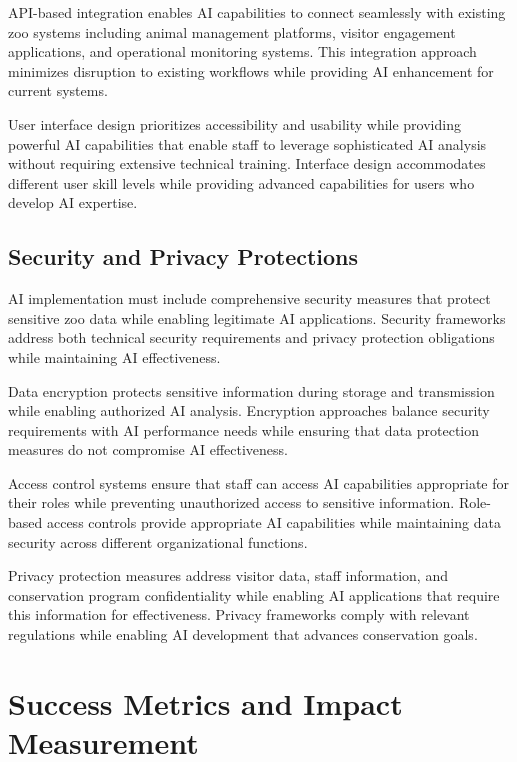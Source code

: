 \documentclass[
  Letterpaper,
]{scrbook}
\begin{document}
API-based integration enables AI capabilities to connect seamlessly with
existing zoo systems including animal management platforms, visitor
engagement applications, and operational monitoring systems. This
integration approach minimizes disruption to existing workflows while
providing AI enhancement for current systems.

User interface design prioritizes accessibility and usability while
providing powerful AI capabilities that enable staff to leverage
sophisticated AI analysis without requiring extensive technical
training. Interface design accommodates different user skill levels
while providing advanced capabilities for users who develop AI
expertise.

\subsection{Security and Privacy
Protections}\label{security-and-privacy-protections}

AI implementation must include comprehensive security measures that
protect sensitive zoo data while enabling legitimate AI applications.
Security frameworks address both technical security requirements and
privacy protection obligations while maintaining AI effectiveness.

Data encryption protects sensitive information during storage and
transmission while enabling authorized AI analysis. Encryption
approaches balance security requirements with AI performance needs while
ensuring that data protection measures do not compromise AI
effectiveness.

Access control systems ensure that staff can access AI capabilities
appropriate for their roles while preventing unauthorized access to
sensitive information. Role-based access controls provide appropriate AI
capabilities while maintaining data security across different
organizational functions.

Privacy protection measures address visitor data, staff information, and
conservation program confidentiality while enabling AI applications that
require this information for effectiveness. Privacy frameworks comply
with relevant regulations while enabling AI development that advances
conservation goals.

\section{Success Metrics and Impact
Measurement}\label{success-metrics-and-impact-measurement}
\end{document}
